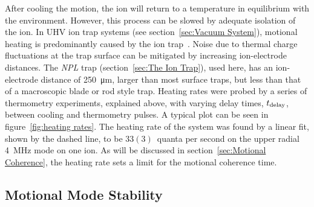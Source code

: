     After cooling the motion, the ion will return to a temperature in equilibrium with the environment. However, this process can be slowed by adequate isolation of the ion. In UHV ion trap systems (see section~\ref{sec:Vacuum System}), motional heating is predominantly caused by the ion trap~\cite{wineland1998experimental}. Noise due to thermal charge fluctuations at the trap surface can be 
    mitigated by increasing ion-electrode distances. The \emph{NPL} trap (section~\ref{sec:The Ion Trap}), used here, has an ion-electrode 
    distance of 250~\unit{\um}, larger than most surface traps, but less than that of a
    macroscopic blade or rod style trap. Heating rates were probed by a series of thermometry experiments, explained above, with varying delay
    times, $t_{\rm delay}$, between cooling and thermometry pulses. A typical plot can be seen in
    figure~\ref{fig:heating rates}. The heating rate of the system
    was found by a linear fit, shown by the dashed line, to be $33(3)$~quanta per second on the upper radial 4~\unit{\MHz} mode on
    one ion. As will be discussed in section~\ref{sec:Motional Coherence}, the heating rate sets a limit for the motional coherence time.\\


\subsection{Motional Mode Stability}
\label{sec:Motional Mode Stability}

